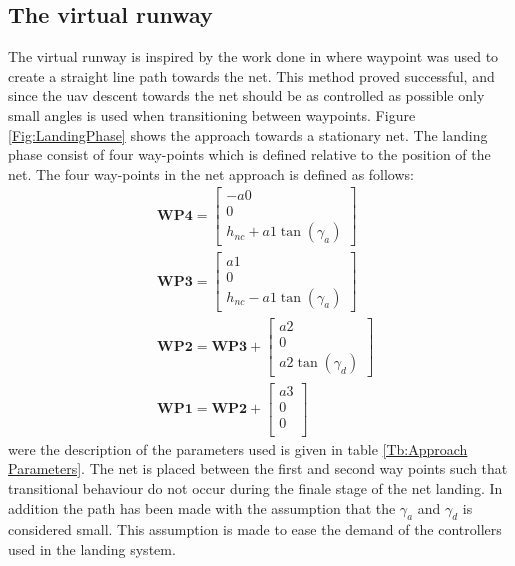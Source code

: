 \subsection{The virtual runway}\label{SS:netApproach}
The virtual runway is inspired by the work done in \citep{Skulstad&Syversen} where waypoint was used to create a straight line path towards the net. This method proved successful, and since the \gls{uav} descent towards the net should be as controlled as possible only small angles is used when transitioning between waypoints. Figure \ref{Fig:LandingPhase} shows the approach towards a stationary net. The landing phase consist of four way-points which is defined relative to the position of the net. The four way-points in the net approach is defined as follows:
\begin{subequations}
\begin{align}
&\mathbf{WP4} = 
\begin{bmatrix}
-a0 \\
0 \\
h_{nc} + a1\tan(\gamma_a) 
\end{bmatrix}\\
&\mathbf{WP3} = 
\begin{bmatrix}
a1 \\
0 \\
h_{nc} - a1\tan(\gamma_a)
\end{bmatrix}\\
&\mathbf{WP2} = \mathbf{WP3} + 
\begin{bmatrix}
a2 \\
0 \\
a2\tan(\gamma_d)
\end{bmatrix}\\
&\mathbf{WP1} = \mathbf{WP2} + 
\begin{bmatrix}
a3 \\
0 \\
0 \\
\end{bmatrix}
\end{align}
\end{subequations}
were the description of the parameters used is given in table \ref{Tb:Approach Parameters}. The net is placed between the first and second way points such that transitional behaviour do not occur during the finale stage of the net landing. In addition the path has been made with the assumption that the $\gamma_a$ and $\gamma_d$ is considered small. This assumption is made to ease the demand of the controllers used in the landing system.
